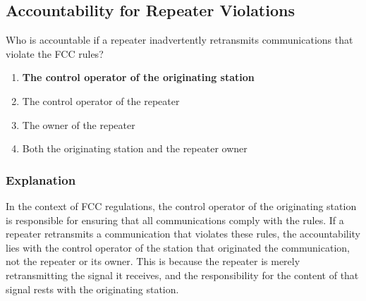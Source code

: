 \subsection{Accountability for Repeater Violations}
\label{T1F10}

\begin{tcolorbox}[colback=gray!10!white,colframe=black!75!black,title=T1F10]
Who is accountable if a repeater inadvertently retransmits communications that violate the FCC rules?
\begin{enumerate}[label=\Alph*,noitemsep]
    \item \textbf{The control operator of the originating station}
    \item The control operator of the repeater
    \item The owner of the repeater
    \item Both the originating station and the repeater owner
\end{enumerate}
\end{tcolorbox}

\subsubsection*{Explanation}
In the context of FCC regulations, the control operator of the originating station is responsible for ensuring that all communications comply with the rules. If a repeater retransmits a communication that violates these rules, the accountability lies with the control operator of the station that originated the communication, not the repeater or its owner. This is because the repeater is merely retransmitting the signal it receives, and the responsibility for the content of that signal rests with the originating station.